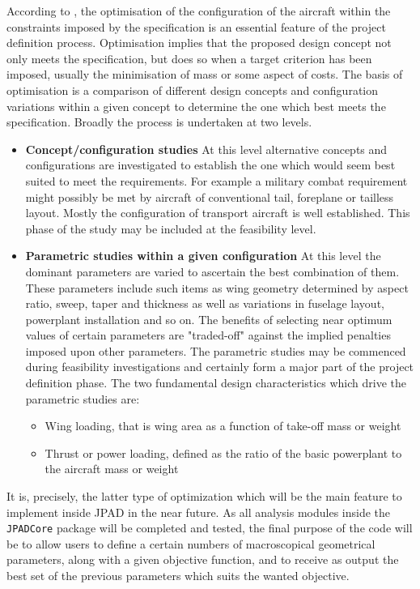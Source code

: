\bigskip
\noindent
According to \cite{howe2000aircraft}, the optimisation of the configuration of the aircraft within the constraints imposed by the specification is an essential feature of the project definition process. Optimisation implies that the proposed design concept not only meets the specification, but does so when a target criterion has been imposed, usually the minimisation of mass or some aspect of costs.
%
The basis of optimisation is a comparison of different design concepts and configuration variations within a given concept to determine the one which best meets the specification. Broadly the process is undertaken at two levels.
%
\begin{itemize}
\item \textbf{Concept/configuration studies} At this level alternative concepts and configurations are investigated to establish the one which would seem best suited to meet the requirements. For example a military combat requirement might possibly be met by aircraft of conventional tail, foreplane or tailless layout. Mostly the configuration of transport aircraft is well established. This phase of the study may be included at the feasibility level.
\item \textbf{Parametric studies within a given configuration} At this level the dominant parameters are varied to ascertain the best combination of them. These parameters include such items as wing geometry determined by aspect ratio, sweep, taper and thickness as well as variations in fuselage layout, powerplant installation and so on. The benefits of selecting near optimum values of certain parameters are "traded-off" against the implied penalties
imposed upon other parameters. The parametric studies may be commenced during feasibility investigations and certainly form a major part of the project definition phase. The two fundamental design characteristics which drive the parametric studies are:
\begin{itemize}
\item Wing loading, that is wing area as a function of take-off mass or weight
\item Thrust or power loading, defined as the ratio of the basic powerplant to the aircraft mass or weight
\end{itemize}
\end{itemize}
%
It is, precisely, the latter type of optimization which will be the main feature to implement inside \gls{JPAD} in the near future. As all analysis modules inside the \lstinline[language=Java]!JPADCore! package will be completed and tested, the final purpose of the code will be to allow users to define a certain numbers of macroscopical geometrical parameters, along with a given objective function, and to receive as output the best set of the previous parameters which suits the wanted objective.















